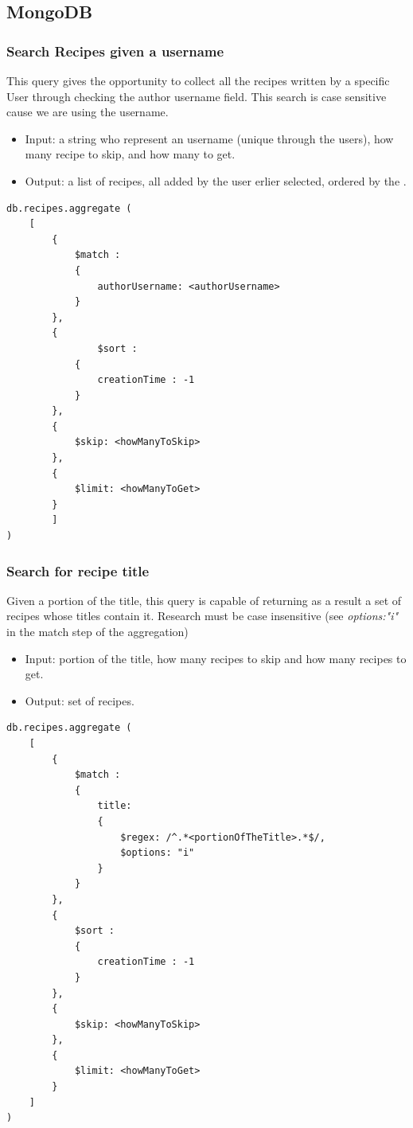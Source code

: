 \documentclass[a4paper]{report}
\begin{document}
\subsection{MongoDB}

\subsubsection{Search Recipes given a username}

This query gives the opportunity to collect all the recipes written by a specific User through checking the author username field. This search is case sensitive cause we are using the username.
\begin{itemize}
	\item Input: a string who represent an username (unique through the users), how many recipe to skip, and how many to get.
	\item Output: a list of recipes, all added by the user erlier selected, ordered by the .
\end{itemize}
\lstset{ language=C++}
\begin{lstlisting}
db.recipes.aggregate (
	[
		{ 
			$match : 
			{ 
				authorUsername: <authorUsername>
			}  
		},
		{ 
				$sort : 
			{ 
				creationTime : -1 
			} 
		},
		{ 
			$skip: <howManyToSkip> 
		},
		{ 
			$limit: <howManyToGet> 
		}	
		]
)
\end{lstlisting}
\subsubsection{Search for recipe title}
Given a portion of the title, this query is capable of returning as a result a set of recipes whose titles contain it. Research must be case insensitive (see \emph{options:"i"} in the match step of the aggregation)
\begin{itemize}
\item Input: portion of the title, how many recipes to skip and how many recipes to get.
\item Output: set of recipes.	
\end{itemize}
\lstset{ language=java}
\begin{lstlisting}
db.recipes.aggregate (
	[
		{ 
			$match : 
			{ 
				title: 
				{
					$regex: /^.*<portionOfTheTitle>.*$/,
					$options: "i"
				} 
			}  
		},
		{ 
			$sort : 
			{ 
				creationTime : -1 
			} 
		},
		{ 
			$skip: <howManyToSkip> 
		},
		{ 
			$limit: <howManyToGet> 
		}	
	]
)
\end{lstlisting} 
\end{document}
